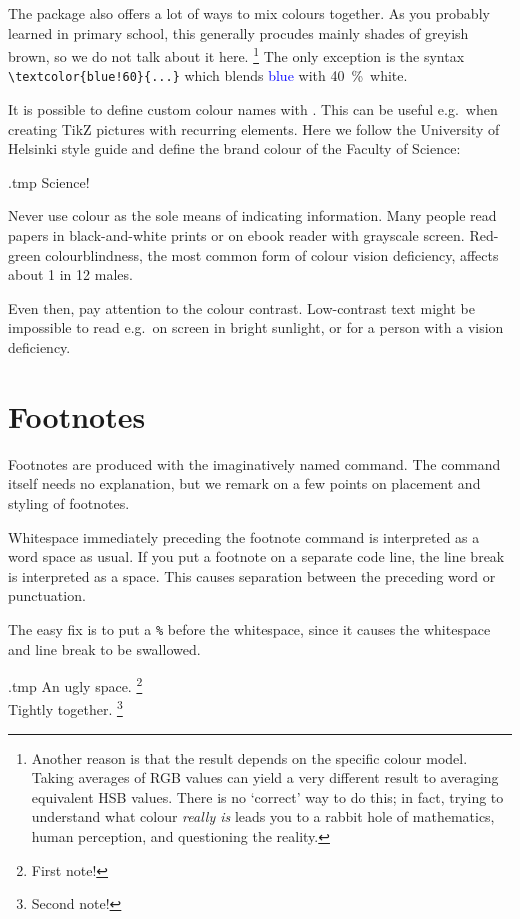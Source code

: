 The package also offers a lot of ways to mix colours together.
As you probably learned in primary school,
this generally procudes mainly shades of greyish brown, so we do not talk about it here.%
\footnote{Another reason is that the result depends on the specific colour model.
Taking averages of RGB values can yield a very different result to averaging equivalent HSB values.
There is no `correct' way to do this;
in fact, trying to understand what colour \emph{really is}
leads you to a rabbit hole of mathematics, human perception, and questioning the reality.}
The only exception is the syntax \verb|\textcolor{blue!60}{...}|
which blends \textcolor{blue}{blue} with \textcolor{blue!60}{40~\%~white}.

It is possible to define custom colour names with .
This can be useful e.g.\ when creating TikZ pictures with recurring elements.
Here we follow the University of Helsinki style guide
and define the brand colour of the Faculty of Science:
%
\begin{VerbatimOut}{\jobname.tmp}
\textcolor{Sciency}{Science!}
\end{VerbatimOut}
\ShowExample

\begin{practices}
Never use colour as the sole means of indicating information.
Many people read papers in black-and-white prints
or on ebook reader with grayscale screen.
Red-green colourblindness,
the most common form of colour vision deficiency,
affects about 1 in 12 males.

Even then, pay attention to the colour contrast.
Low-contrast text might be impossible to read e.g.\ on screen in bright sunlight,
or for a person with a vision deficiency.
\end{practices}


%
%
%
\section{Footnotes}

Footnotes are produced with the imaginatively named  command.
The command itself needs no explanation,
but we remark on a few points on placement and styling of footnotes.

\begin{gotcha}
Whitespace immediately preceding the footnote command is interpreted as a word space as usual.
If you put a footnote on a separate code line,
the line break is interpreted as a space.
This causes separation between the preceding word or punctuation.

The easy fix is to put a \verb|%| before the whitespace,
since it causes the whitespace and line break to be swallowed.
\begin{VerbatimOut}{\jobname.tmp}
An ugly space.
\footnote{First note!}\\

Tightly together.%
\footnote{Second note!}
\end{VerbatimOut}
\ShowExample
\end{gotcha}

